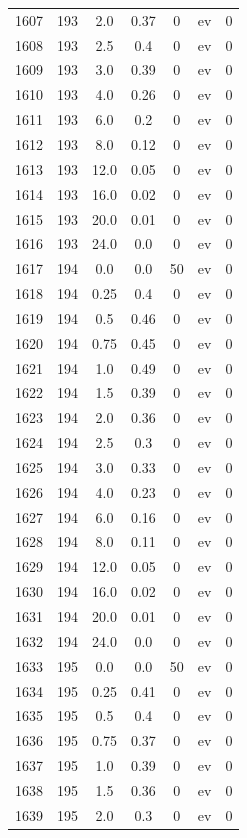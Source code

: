 \documentclass[12pt,a4paper]{article}
\begin{document}
\begin{tabular}{r|cccccc}
	1607 & 193 & 2.0 & 0.37 & 0 & ev & 0 \\
	1608 & 193 & 2.5 & 0.4 & 0 & ev & 0 \\
	1609 & 193 & 3.0 & 0.39 & 0 & ev & 0 \\
	1610 & 193 & 4.0 & 0.26 & 0 & ev & 0 \\
	1611 & 193 & 6.0 & 0.2 & 0 & ev & 0 \\
	1612 & 193 & 8.0 & 0.12 & 0 & ev & 0 \\
	1613 & 193 & 12.0 & 0.05 & 0 & ev & 0 \\
	1614 & 193 & 16.0 & 0.02 & 0 & ev & 0 \\
	1615 & 193 & 20.0 & 0.01 & 0 & ev & 0 \\
	1616 & 193 & 24.0 & 0.0 & 0 & ev & 0 \\
	1617 & 194 & 0.0 & 0.0 & 50 & ev & 0 \\
	1618 & 194 & 0.25 & 0.4 & 0 & ev & 0 \\
	1619 & 194 & 0.5 & 0.46 & 0 & ev & 0 \\
	1620 & 194 & 0.75 & 0.45 & 0 & ev & 0 \\
	1621 & 194 & 1.0 & 0.49 & 0 & ev & 0 \\
	1622 & 194 & 1.5 & 0.39 & 0 & ev & 0 \\
	1623 & 194 & 2.0 & 0.36 & 0 & ev & 0 \\
	1624 & 194 & 2.5 & 0.3 & 0 & ev & 0 \\
	1625 & 194 & 3.0 & 0.33 & 0 & ev & 0 \\
	1626 & 194 & 4.0 & 0.23 & 0 & ev & 0 \\
	1627 & 194 & 6.0 & 0.16 & 0 & ev & 0 \\
	1628 & 194 & 8.0 & 0.11 & 0 & ev & 0 \\
	1629 & 194 & 12.0 & 0.05 & 0 & ev & 0 \\
	1630 & 194 & 16.0 & 0.02 & 0 & ev & 0 \\
	1631 & 194 & 20.0 & 0.01 & 0 & ev & 0 \\
	1632 & 194 & 24.0 & 0.0 & 0 & ev & 0 \\
	1633 & 195 & 0.0 & 0.0 & 50 & ev & 0 \\
	1634 & 195 & 0.25 & 0.41 & 0 & ev & 0 \\
	1635 & 195 & 0.5 & 0.4 & 0 & ev & 0 \\
	1636 & 195 & 0.75 & 0.37 & 0 & ev & 0 \\
	1637 & 195 & 1.0 & 0.39 & 0 & ev & 0 \\
	1638 & 195 & 1.5 & 0.36 & 0 & ev & 0 \\
	1639 & 195 & 2.0 & 0.3 & 0 & ev & 0 \\

\end{tabular}
\end{document}
